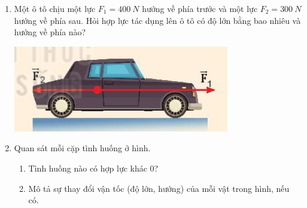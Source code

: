 \begin{enumerate}[label=\bfseries Câu \arabic*:]
{\begin{enumerate}[label=\alph*)]
		\end{enumerate}
	}
	
		\item {}
	
	{
	Một ô tô chịu một lực $F_1 = \SI{400}{N}$ hướng về phía trước và một lực $F_2 = \SI{300}{N}$ hướng về phía sau. Hỏi hợp lực tác dụng lên ô tô có độ lớn bằng bao nhiêu và hướng về phía nào?
	
	\begin{center}
		\includegraphics[scale=0.7]{../figs/VN10-2022-PH-TP015-1.jpg}
	\end{center}
	
	}
	
	\item {}
	
	{
		Quan sát mỗi cặp tình huống ở hình.
		\begin{enumerate}[label=\alph*)]
			\item Tình huống nào có hợp lực khác 0?
			\item Mô tả sự thay đổi vận tốc (độ lớn, hướng) của mỗi vật trong hình, nếu có.
			
		\end{enumerate}
		
}
\end{enumerate}
